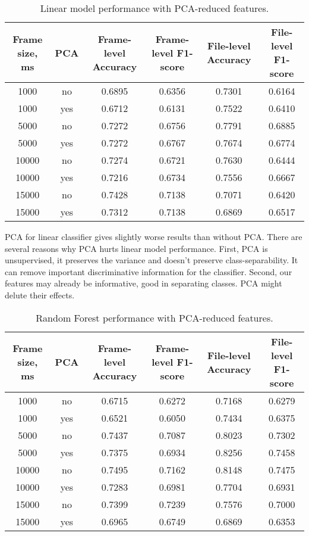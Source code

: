 \documentclass[conference]{IEEEtran}
\begin{document}
\begin{table}[h]
\centering
\caption{Linear model performance with PCA-reduced features.}
\begin{tabular}{|c|c|c|c|c|c|}
\hline
\textbf{Frame size, ms} & \textbf{PCA} & \textbf{Frame-level Accuracy} & \textbf{Frame-level F1-score} & \textbf{File-level Accuracy} & \textbf{File-level F1-score} \\
\hline
1000 & no & 0.6895 & 0.6356 & 0.7301 & 0.6164 \\
\hline
1000 & yes & 0.6712 & 0.6131 & 0.7522 & 0.6410 \\
\hline
5000 & no & 0.7272 & 0.6756 & 0.7791 & 0.6885 \\
\hline
5000 & yes & 0.7272 & 0.6767 & 0.7674 & 0.6774 \\
\hline
10000 & no & 0.7274 & 0.6721 & 0.7630 & 0.6444 \\
\hline
10000 & yes & 0.7216 & 0.6734 & 0.7556 & 0.6667 \\
\hline
15000 & no & 0.7428 & 0.7138 & 0.7071 & 0.6420 \\
\hline
15000 & yes & 0.7312 & 0.7138 & 0.6869 & 0.6517 \\
\hline
\end{tabular}
\label{tab:linear_model_pca}
\end{table}


PCA for linear classifier gives slightly worse results than without PCA.
There are several reasons why PCA hurts linear model performance. 
First, PCA is unsupervised, it preserves the variance and doesn't preserve class-separability.
It can remove important discriminative information for the classifier.
Second, our features may already be informative, good in separating classes.
PCA might delute their effects.


\begin{table}[h]
\centering
\caption{Random Forest performance with PCA-reduced features.}
\begin{tabular}{|c|c|c|c|c|c|}
\hline
\textbf{Frame size, ms} & \textbf{PCA} & \textbf{Frame-level Accuracy} & \textbf{Frame-level F1-score} & \textbf{File-level Accuracy} & \textbf{File-level F1-score} \\
\hline
1000 & no & 0.6715 & 0.6272 & 0.7168 & 0.6279 \\
\hline
1000 & yes & 0.6521 & 0.6050 & 0.7434 & 0.6375 \\
\hline
5000 & no & 0.7437 & 0.7087 & 0.8023 & 0.7302 \\
\hline
5000 & yes & 0.7375 & 0.6934 & 0.8256 & 0.7458 \\
\hline
10000 & no & 0.7495 & 0.7162 & 0.8148 & 0.7475 \\
\hline
10000 & yes & 0.7283 & 0.6981 & 0.7704 & 0.6931 \\
\hline
15000 & no & 0.7399 & 0.7239 & 0.7576 & 0.7000 \\
\hline
15000 & yes & 0.6965 & 0.6749 & 0.6869 & 0.6353 \\
\hline
\end{tabular}
\label{tab:random_forest_pca}
\end{table}
\end{document}
